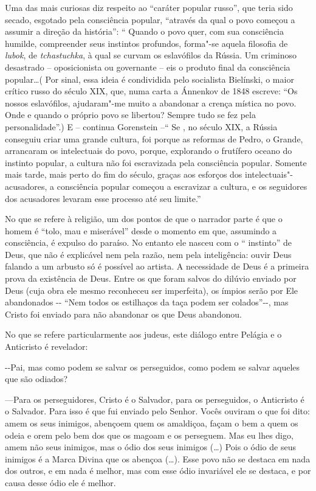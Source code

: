 Uma das mais curiosas diz respeito ao ``caráter popular russo'', que
teria sido secado, esgotado pela consciência popular, ``através da qual
o povo começou a assumir a direção da história'': `` Quando o povo quer,
com sua consciência humilde, compreender seus instintos profundos,
forma"-se aquela filosofia de \emph{lubok}, de \emph{tchastuchka}, à qual
se curvam os eslavófilos da Rússia. Um criminoso desastrado --
oposicionista ou governante -- eis o produto final da consciência
popular\ldots{}( Por sinal, essa ideia é condividida pelo socialista
Bielínski, o maior crítico russo do século XIX, que, numa carta a
Ánnenkov de 1848 escreve: ``Os nossos eslavófilos, ajudaram"-me muito a
abandonar a crença mística no povo. Onde e quando o próprio povo se
libertou? Sempre tudo se fez pela personalidade''.) E -- continua
Gorenstein --`` Se , no século XIX, a Rússia conseguiu criar uma grande
cultura, foi porque as reformas de Pedro, o Grande, arrancaram os
intelectuais do povo, porque, explorando o frutífero oceano do instinto
popular, a cultura não foi escravizada pela consciência popular. Somente
mais tarde, mais perto do fim do século, graças aos esforços dos
intelectuais"-acusadores, a consciência popular começou a escravizar a
cultura, e os seguidores dos acusadores levaram esse processo até seu
limite.''

No que se refere à religião, um dos pontos de que o narrador parte é que
o homem é ``tolo, mau e miserável'' desde o momento em que, assumindo a
consciência, é expulso do paraíso. No entanto ele nasceu com o ``
instinto'' de Deus, que não é explicável nem pela razão, nem pela
inteligência: ouvir Deus falando a um arbusto só é possível ao artista.
A necessidade de Deus é a primeira prova da existência de Deus. Entre os
que foram salvos do dilúvio enviado por Deus (cuja obra ele mesmo
reconheceu ser imperfeita), os ímpios serão por Ele abandonados -\/-
``Nem todos os estilhaços da taça podem ser colados''-\/-, mas Cristo
foi enviado para não abandonar os que Deus abandonou.

No que se refere particularmente aos judeus, este diálogo entre Pelágia
e o Anticristo é revelador:

-\/-Pai, mas como podem se salvar os perseguidos, como podem se salvar
aqueles que são odiados?

---Para os perseguidores, Cristo é o Salvador, para os perseguidos, o
Anticristo é o Salvador. Para isso é que fui enviado pelo Senhor. Vocês
ouviram o que foi dito: amem os seus inimigos, abençoem quem os
amaldiçoa, façam o bem a quem os odeia e orem pelo bem dos que os magoam
e os perseguem. Mas eu lhes digo, amem não seus inimigos, mas o ódio dos
seus inimigos (\ldots{}) Pois o ódio de seus inimigos é a Marca Divina que os
abençoa (\ldots{}). Esse povo não se destaca em nada dos outros, e em nada é
melhor, mas com esse ódio invariável ele se destaca, e por causa desse
ódio ele é melhor.

